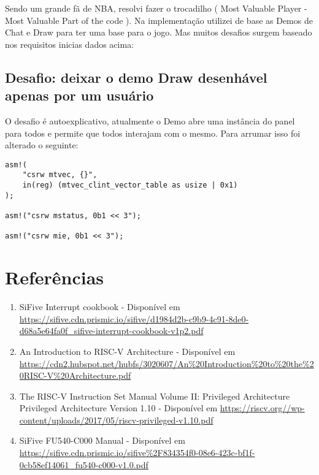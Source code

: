\documentclass{article}
\begin{document}
Sendo um grande fã de NBA, resolvi fazer o trocadilho ( Most Valuable Player - Most Valuable Part of the code ). Na implementação utilizei de base as Demos de Chat e Draw para ter uma base para o jogo. Mas muitos desafios surgem baseado nos requisitos inicias dados acima:


\subsection{Desafio: deixar o demo Draw desenhável apenas por um usuário}

O desafio é autoexplicativo, atualmente o Demo abre uma instância do panel para todos e permite que todos interajam com o mesmo. Para arrumar isso foi alterado o seguinte: 


\begin{lstlisting} 
asm!(
    "csrw mtvec, {}",
    in(reg) (mtvec_clint_vector_table as usize | 0x1)
);

asm!("csrw mstatus, 0b1 << 3");

asm!("csrw mie, 0b1 << 3");
\end{lstlisting}
    
\section{Referências}

\begin{enumerate}
 \item SiFive Interrupt cookbook - Disponível em \url{https://sifive.cdn.prismic.io/sifive/d1984d2b-c9b9-4c91-8de0-d68a5e64fa0f_sifive-interrupt-cookbook-v1p2.pdf}
 \item An Introduction to RISC-V Architecture - Disponível em \url{https://cdn2.hubspot.net/hubfs/3020607/An%20Introduction%20to%20the%20RISC-V%20Architecture.pdf}
 \item The RISC-V Instruction Set Manual Volume II: Privileged Architecture Privileged Architecture Version 1.10 - Disponível em \url{https://riscv.org//wp-content/uploads/2017/05/riscv-privileged-v1.10.pdf}
 \item SiFive FU540-C000 Manual - Disponível em \url{https://sifive.cdn.prismic.io/sifive%2F834354f0-08e6-423c-bf1f-0cb58ef14061_fu540-c000-v1.0.pdf}
\end{enumerate}
\end{document}
